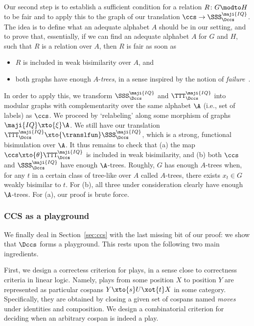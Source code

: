\documentclass{LMCS}
\renewcommand{\QFI}{\maji{IQ}}
\renewcommand{\LLL}{\QFI}
\renewcommand{\SSSL}{\SSS^{\LLL}}
\renewcommand{\TTTL}{\TTT^{\LLL}}
\theoremstyle{plain}\newtheorem{satz}[thm]{Satz}
\begin{document}
Our second step is to establish a sufficient condition for a relation
$R \colon G \modto H$ to be fair and to apply this to the graph of our
translation $\ccs \to \SSSL_{\Dccs}$.  The idea is to define what an
adequate alphabet $A$ should be in our setting, and to prove that,
essentially, if we can find an adequate alphabet $A$ for $G$ and $H$,
such that $R$ is a relation over $A$, then $R$ is fair as soon as
\begin{itemize}
\item $R$ is included in weak bisimilarity over $A$, and
\item both graphs have enough $A$-\emph{trees}, in a sense
  inspired by the notion of
  \emph{failure}~\cite{DBLP:journals/iandc/RensinkV07}.
\end{itemize}
In order to apply this, we transform $\SSSL_{\Dccs}$ and
$\TTTL_{\Dccs}$ into modular graphs with complementarity over the same
alphabet $\A$ (i.e., set of labels) as $\ccs$.  We proceed by
`relabeling' along some morphism of graphs $\LLL \xto{\xi} \A$.  We
still have our translation $\TTTL_{\Dccs} \xto{\translfun}
\SSSL_{\Dccs}$, which is a strong, functional bisimulation over $\A$.
It thus remains to check that (a) the map $\ccs \xto{\theta}
\TTTL_{\Dccs}$ is included in weak bisimilarity, and (b) both $\ccs$
and $\SSSL_{\Dccs}$ have enough $\A$-trees.  Roughly, $G$ has enough
$A$-trees when, for any $t$ in a certain class of tree-like \ltss{}
over $A$ called $A$-trees, there exists $x_t \in G$ weakly bisimilar
to $t$.  For (b), all three \ltss{} under consideration clearly have
enough $\A$-trees. For (a), our proof is brute force.


\subsubsection{CCS as a playground}
We finally deal in Section~\ref{sec:ccs} with the last missing bit of
our proof: we show that $\Dccs$ forms a playground. This rests upon
the following two main ingredients.

First, we design a correctess criterion for plays, in a sense close to
correctness criteria in linear logic.  Namely, plays from some
position $X$ to position $Y$ are represented as particular cospans $Y
\xto{s} U \xot{t} X$ in some category.  Specifically, they are
obtained by closing a given set of cospans named \emph{moves} under
identities and composition.  We design a combinatorial criterion
for deciding when an arbitrary cospan is indeed a play.
\end{document}
